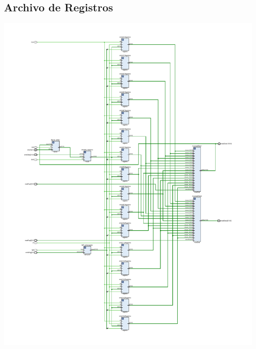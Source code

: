 \documentclass[8pt,executivepaper]{article}
\begin{document}
\subsection{Archivo de Registros}
\begin{center}
  \includegraphics[scale=0.5]{sources/schematicArchReg.pdf}
\end{center}
\end{document}
